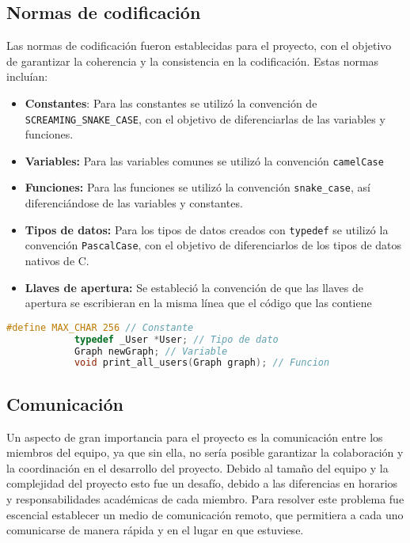 \documentclass[9pt,letterpaper,onecolumn]{rho-class/rho}
\begin{document}
    \subsection{Normas de codificación}

        Las normas de codificación fueron establecidas para el proyecto, con el objetivo de garantizar la coherencia y la consistencia en la codificación. Estas normas incluían:

        \begin{itemize}
            \item \textbf{Constantes}: Para las constantes se utilizó la convención de \texttt{SCREAMING\_SNAKE\_CASE}, con el objetivo de diferenciarlas de las variables y funciones.
            \item \textbf{Variables:} Para las variables comunes se utilizó la convención \texttt{camelCase}
            \item \textbf{Funciones:} Para las funciones se utilizó la convención \texttt{snake\_case}, así diferenciándose de las variables y constantes.
            \item \textbf{Tipos de datos:} Para los tipos de datos creados con \texttt{typedef} se utilizó la convención \texttt{PascalCase}, con el objetivo de diferenciarlos de los tipos de datos nativos de C.
            \item \textbf{Llaves de apertura:} Se estableció la convención de que las llaves de apertura se escribieran en la misma línea que el código que las contiene
        \end{itemize}

        \begin{lstlisting}[caption={Ejemplo de código, utilizando las normas de codificación}, label={lst:normas_codificacion}, language=C]
            #define MAX_CHAR 256 // Constante
            typedef _User *User; // Tipo de dato
            Graph newGraph; // Variable
            void print_all_users(Graph graph); // Funcion
        \end{lstlisting}

    \subsection{Comunicación}

    Un aspecto de gran importancia para el proyecto es la comunicación entre los miembros del equipo, ya que sin ella, no sería posible garantizar la colaboración y la coordinación en el desarrollo del proyecto. Debido al tamaño del equipo y la complejidad del proyecto esto fue un desafío, debido a las diferencias en horarios y responsabilidades académicas de cada miembro. Para resolver este problema fue escencial establecer un medio de comunicación remoto, que permitiera a cada uno comunicarse de manera rápida y en el lugar en que estuviese.
\end{document}
